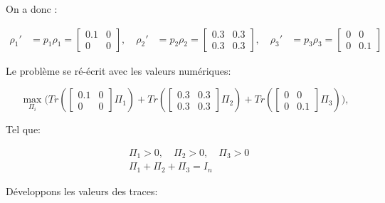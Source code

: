\documentclass[12pt,a4paper]{article}
\begin{document}
    On a donc :
    
    \begin{align}
        \rho_1' & = p_1 \rho_1 = \begin{bmatrix} 0.1 & 0 \\ 0 & 0 \end{bmatrix} , \quad \rho_2' & = p_2 \rho_2 = \begin{bmatrix} 0.3 & 0.3 \\ 0.3 & 0.3 \end{bmatrix}, \quad \rho_3' & = p_3 \rho_3 = \begin{bmatrix} 0 & 0 \\ 0 & 0.1 \end{bmatrix} \nonumber
    \end{align}

    Le problème se ré-écrit avec les valeurs numériques:

    \begin{equation}
        \max\limits_{\Pi_i} \bigg(Tr( \begin{bmatrix} 0.1 & 0 \\ 0 & 0 \end{bmatrix} \Pi_1) + Tr(\begin{bmatrix} 0.3 & 0.3 \\ 0.3 & 0.3 \end{bmatrix} \Pi_2 ) + Tr(\begin{bmatrix} 0 & 0 \\ 0 & 0.1 \end{bmatrix}\Pi_3) \bigg),
    \end{equation}

    Tel que:

    \begin{align}
        & \Pi_1 > 0 , \quad \Pi_2 > 0 , \quad \Pi_3 > 0 \nonumber \\
        & \Pi_1 + \Pi_2 + \Pi_3 = I_n
    \end{align}

    Développons les valeurs des traces:
\end{document}
